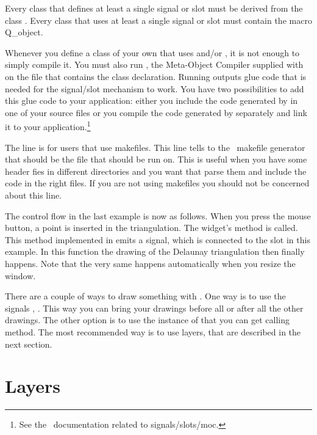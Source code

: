 Every class that defines at least a single signal or slot must 
be derived from the class . Every class that uses at
least a single signal or slot must contain the macro {\sc Q\_object}.

Whenever you define a class of your own that uses  and/or
, it is not enough to simply compile it. You must also run
, the Meta-Object Compiler supplied with \qt\, on the file
that contains the class declaration. Running  outputs glue code that
is needed for the signal/slot mechanism to work. You have two
possibilities to add this glue code to your application: either you
include the code generated by  in one of your source files or 
you compile the code generated by  separately and link it to your
application.\footnote{See the \qt\ documentation related to signals/slots/moc.}

The line  is for users that use
makefiles. This line tells to the \cgal\ makefile generator that
 should be the file that  should be run on.
 This is useful when you
have some header fies in different directories and you want that
 parse them and include the code in the right files. If you
are not using makefiles you should not be concerned about this line.

The control flow in the last example is now as follows. When you press the
mouse button, a point is inserted in the triangulation.  The widget's
method  is called. This method implemented in
 emits a signal, which is connected to the slot 
 in this example. In this
function the drawing of the Delaunay triangulation then finally
happens.  Note that the very same happens automatically when you
resize the window.

\begin{ccAdvanced}
There are a couple of ways to draw something with . One way
is to use the signals , .
This way you can bring your drawings before all or after all the
other drawings. The other option is to use the  instance 
of  that you can get calling 
method. The most recommended way is to use layers, that are described
in the next section.
\end{ccAdvanced}

\section{Layers}
\label{Qt_widget_layers}
